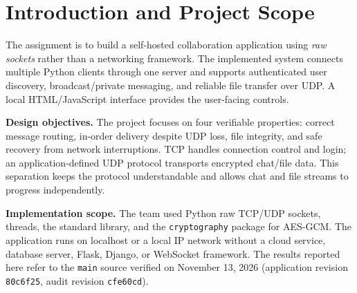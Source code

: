 \section{Introduction and Project Scope}

The assignment is to build a self-hosted collaboration application using \emph{raw sockets} rather than a networking framework. The implemented system connects multiple Python clients through one server and supports authenticated user discovery, broadcast/private messaging, and reliable file transfer over UDP. A local HTML/JavaScript interface provides the user-facing controls.

\noindent\textbf{Design objectives.} The project focuses on four verifiable properties: correct message routing, in-order delivery despite UDP loss, file integrity, and safe recovery from network interruptions. TCP handles connection control and login; an application-defined UDP protocol transports encrypted chat/file data. This separation keeps the protocol understandable and allows chat and file streams to progress independently.

\noindent\textbf{Implementation scope.} The team used Python raw TCP/UDP sockets, threads, the standard library, and the \texttt{cryptography} package for AES-GCM. The application runs on localhost or a local IP network without a cloud service, database server, Flask, Django, or WebSocket framework. The results reported here refer to the \texttt{main} source verified on November 13, 2026 (application revision \texttt{80c6f25}, audit revision \texttt{cfe60cd}).

\medskip{}
